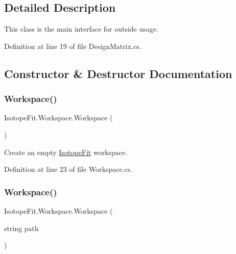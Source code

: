 \subsection{Detailed Description}
This class is the main interface for outside usage. 



Definition at line 19 of file Design\+Matrix.\+cs.



\subsection{Constructor \& Destructor Documentation}
\mbox{\label{class_isotope_fit_1_1_workspace_affa8b6ac937cee367c225c606782da17}} 
\subsubsection{\texorpdfstring{Workspace()}{Workspace()}\hspace{0.1cm}{\footnotesize\ttfamily [1/2]}}
{\footnotesize\ttfamily Isotope\+Fit.\+Workspace.\+Workspace (\begin{DoxyParamCaption}{ }\end{DoxyParamCaption})}



Create an empty \hyperlink{namespace_isotope_fit}{Isotope\+Fit} workspace. 



Definition at line 23 of file Workspace.\+cs.

\mbox{\label{class_isotope_fit_1_1_workspace_a5aa1f6546513d331f262d383fe6b0358}} 
\subsubsection{\texorpdfstring{Workspace()}{Workspace()}\hspace{0.1cm}{\footnotesize\ttfamily [2/2]}}
{\footnotesize\ttfamily Isotope\+Fit.\+Workspace.\+Workspace (\begin{DoxyParamCaption}\item[{string}]{path }\end{DoxyParamCaption})}



